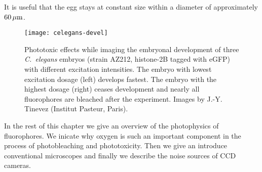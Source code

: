 It is useful that the egg stays at constant size within a diameter   
of approximately $\unit[60]{\mu m}$.

\begin{figure}[!htb]
  \centering
  \texttt{[image: celegans-devel]}
  \caption{Phototoxic effects while imaging the embryonal development
    of three \emph{C.~elegans} embryos (strain AZ212, histone-2B
    tagged with eGFP) with different excitation intensities. The
    embryo with lowest excitation dosage (left) develops fastest. The
    embryo with the highest dosage (right) ceases development and
    nearly all fluorophores are bleached after the experiment. Images by
    J.-Y. Tinevez (Institut Pasteur, Paris).}
  \label{fig:celegans-devel}
\end{figure}


In the rest of this chapter we give an overview of the photophysics of
fluorophores. We inicate why oxygen is such an important component in
the process of photobleaching and phototoxicity.  Then we give an
introduce conventional microscopes and finally we describe the noise
sources of CCD cameras.

